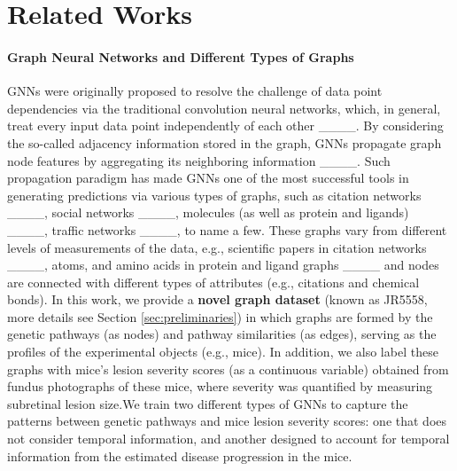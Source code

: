 \section{Related Works}
\label{append:related_works}

\paragraph{Graph Neural Networks and Different Types of Graphs}
GNNs were originally proposed to resolve the challenge of data point dependencies via the traditional convolution neural networks, which, in general, treat every input data point independently of each other ____. By considering the so-called adjacency information stored in the graph, GNNs propagate graph node features by aggregating its neighboring information ____. Such propagation paradigm has made GNNs one of the most successful tools in generating predictions via various types of graphs, such as citation networks ____, social networks ____, molecules (as well as protein and ligands) ____, traffic networks ____, to name a few. These graphs vary from different levels of measurements of the data, e.g., scientific papers in citation networks ____, atoms, and amino acids in protein and ligand graphs ____ and nodes are connected with different types of attributes (e.g., citations and chemical bonds). In this work, we provide a \textbf{novel graph dataset} (known as JR5558, more details see Section \ref{sec:preliminaries}) in which graphs are formed by the genetic pathways (as nodes) and pathway similarities (as edges), serving as the profiles of the experimental objects (e.g., mice). In addition, we also label these graphs with mice's lesion severity scores (as a continuous variable) obtained from fundus photographs of these mice, where severity was quantified by measuring subretinal lesion size.We train two different types of GNNs to capture the patterns between genetic pathways and mice lesion severity scores: one that does not consider temporal information, and another designed to account for temporal information from the estimated disease progression in the mice.



